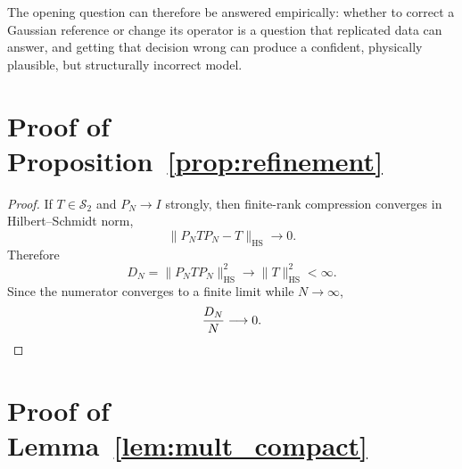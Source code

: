 \documentclass[11pt]{article}
\numberwithin{table}{section}
\numberwithin{figure}{section}
\begin{document}
The opening question can therefore be answered empirically: whether to correct a Gaussian reference or change its operator is a question that replicated data can answer, and getting that decision wrong can produce a confident, physically plausible, but structurally incorrect model.

\FloatBarrier
\appendix

\section{Proof of Proposition~\ref{prop:refinement}}
\label{app:proof_refinement}

\begin{proof}
If $T\in\mathcal S_2$ and $P_N\to I$ strongly, then finite-rank compression converges in Hilbert--Schmidt norm,
\begin{equation}
    \|P_NTP_N-T\|_{\mathrm{HS}}\longrightarrow0.
\end{equation}
Therefore
\begin{equation}
    D_N
    =
    \|P_NTP_N\|_{\mathrm{HS}}^2
    \longrightarrow
    \|T\|_{\mathrm{HS}}^2<\infty.
\end{equation}
Since the numerator converges to a finite limit while $N\to\infty$,
\begin{equation}
    \frac{D_N}{N}\longrightarrow0. \qedhere
\end{equation}
\end{proof}

\section{Proof of Lemma~\ref{lem:mult_compact}}
\label{app:proof_lemma}
\end{document}
